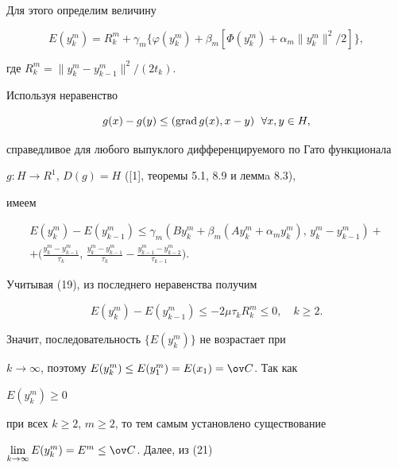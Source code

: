 Для этого определим величину


$$


E(y_k^m)=R_k^m+\gamma_m\{\varphi (y_k^m)+\beta_m[\Phi(y_k^m)+


\alpha_m\|y_k^m\|^2/2]\},


$$


где $R_k^m=\|y_k^m-y_{k-1}^m\|^2/(2t_k)$.


Используя неравенство


\begin{equation}\label {20}


g(x)-g(y)\leq (\grad g(x),x-y)\ \;\forall x,y \in H,


\end{equation}


справедливое для любого выпуклого дифференцируемого по Гато функционала


$g:H\rightarrow R^1$, $D(g)=H$ ([1], теоремы 5.1, 8.9 и леммa 8.3),


имеем


\begin{multline*}


E(y_k^m)-E(y_{k-1}^m)\leq \gamma_m(By_k^m+\beta_m(Ay_k^m+\alpha


_my_k^m),\,y_k^m-y_{k-1}^m)+ \\


%


+\bigg(\frac{y_k^m-y_{k-1}^m}{\tau_k},\, \frac{y_k^m-y_{k-1}^m}


{\tau_k}-\frac{y_{k-1}^m-y_{k-2}^m}{\tau_{k-1}}\bigg).


\end{multline*}


Учитывая (19), из последнего неравенства получим


\begin{equation}\label {21}


E(y_k^m)-E(y_{k-1}^m)\leq -2\mu \tau_kR_k^m\leq 0,\quad k\geq 2.


\end{equation}


Значит, последовательность $\{E(y_k^m)\}$ не возрастает при


$k\rightarrow


\infty $, поэтому $E(y_k^m)\leq E(y_1^m)=E(x_1)=\ov C$. Так как


$E(y_k^m)\geq 0$


при всех $k\geq 2$, $m\geq 2$, то тем самым установлено существование


$\lim\limits_{k\rightarrow \infty }E(y_k^m)=E^m\leq \ov C$. Далее, из (21)


